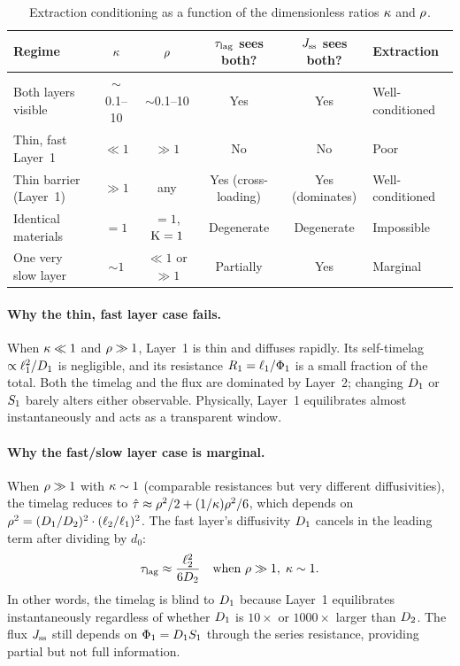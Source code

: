 \begin{table}[ht]
\centering
\caption{Extraction conditioning as a function of the dimensionless ratios
$\kappa$ and $\rho$.}
\label{tab:regimes}
\begin{tabular}{@{}lccccl@{}}
\toprule
\textbf{Regime} & $\kappa$ & $\rho$
  & \textbf{$\tau_{\mathrm{lag}}$ sees both?}
  & \textbf{$J_{\mathrm{ss}}$ sees both?}
  & \textbf{Extraction} \\
\midrule
Both layers visible & $\sim$0.1--10 & $\sim$0.1--10
  & Yes & Yes & Well-conditioned \\[3pt]
Thin, fast Layer~1 & $\ll 1$ & $\gg 1$
  & No & No & Poor \\[3pt]
Thin barrier (Layer~1) & $\gg 1$ & any
  & Yes (cross-loading) & Yes (dominates) & Well-conditioned \\[3pt]
Identical materials & $=1$ & $=1$, $\mathrm{K}=1$
  & Degenerate & Degenerate & Impossible \\[3pt]
One very slow layer & $\sim 1$ & $\ll 1$ or $\gg 1$
  & Partially & Yes & Marginal \\
\bottomrule
\end{tabular}
\end{table}

\paragraph{Why the thin, fast layer case fails.}
When $\kappa \ll 1$ and $\rho \gg 1$, Layer~1 is thin and diffuses rapidly.
Its self-timelag $\propto \ell_{1}^2/D_{1}$ is negligible, and its resistance
$R_1 = \ell_{1}/\Phi_1$ is a small fraction of the total.  Both the timelag
and the flux are dominated by Layer~2; changing $D_{1}$ or $S_{1}$ barely
alters either observable.  Physically, Layer~1 equilibrates almost
instantaneously and acts as a transparent window.

\paragraph{Why the fast/slow layer case is marginal.}
When $\rho \gg 1$ with $\kappa \sim 1$ (comparable resistances but very
different diffusivities), the timelag reduces to
$\hat{\tau} \approx \rho^2/2 + (1/\kappa)\rho^2/6$, which depends on
$\rho^2 = (D_{1}/D_{2})^2\cdot(\ell_{2}/\ell_{1})^2$.  The fast layer's
diffusivity $D_{1}$ cancels in the leading term after dividing by $d_0$:
\begin{equation}
  \tau_{\mathrm{lag}} \approx \frac{\ell_{2}^2}{6D_{2}}
  \quad\text{when } \rho \gg 1,\; \kappa \sim 1.
\end{equation}
In other words, the timelag is blind to $D_{1}$ because
Layer~1 equilibrates instantaneously regardless of whether $D_{1}$ is
$10\times$ or $1000\times$ larger than $D_{2}$.  The flux $J_{\mathrm{ss}}$ still
depends on $\Phi_1 = D_{1}S_{1}$ through the series resistance, providing
partial but not full information.


